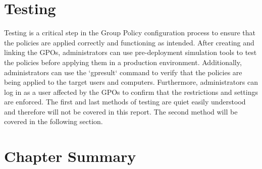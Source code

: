 \section{Testing}

Testing is a critical step in the Group Policy configuration process to ensure that the policies are applied correctly and functioning as intended. After creating and linking the GPOs, administrators can use pre-deployment simulation tools to test the policies before applying them in a production environment. Additionally, administrators can use the `gpresult` command to verify that the policies are being applied to the target users and computers. Furthermore, administrators can log in as a user affected by the GPOs to confirm that the restrictions and settings are enforced.
The first and last methods of testing are quiet easily understood and therefore will not be covered in this report. The second method will be covered in the following section.

\section{Chapter Summary}
